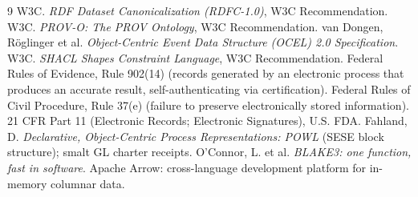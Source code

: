 \documentclass[11pt,a4paper]{article}
\begin{document}
\begin{thebibliography}{9}
 W3C. \emph{RDF Dataset Canonicalization (RDFC-1.0)}, W3C Recommendation.
 W3C. \emph{PROV-O: The PROV Ontology}, W3C Recommendation.
 van Dongen, R\"oglinger et al. \emph{Object-Centric Event Data Structure
(OCEL) 2.0 Specification}.
 W3C. \emph{SHACL Shapes Constraint Language}, W3C Recommendation.
 Federal Rules of Evidence, Rule 902(14) (records generated by an electronic
process that produces an accurate result, self-authenticating via certification).
 Federal Rules of Civil Procedure, Rule 37(e) (failure to preserve
electronically stored information).
 21 CFR Part 11 (Electronic Records; Electronic Signatures), U.S. FDA.
 Fahland, D. \emph{Declarative, Object-Centric Process Representations: POWL}
(SESE block structure); smalt GL charter receipts.
 O'Connor, L. et al. \emph{BLAKE3: one function, fast in software}.
 Apache Arrow: cross-language development platform for in-memory columnar data.
\end{thebibliography}
\end{document}
